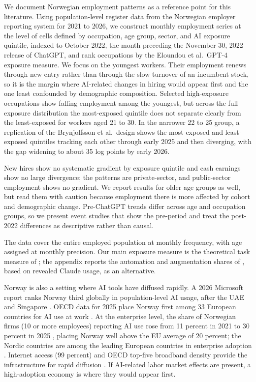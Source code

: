 \documentclass[12pt]{article}
\begin{document}
We document Norwegian employment patterns as a reference point for this literature. Using population-level register data from the Norwegian employer reporting system for 2021 to 2026, we construct monthly employment series at the level of cells defined by occupation, age group, sector, and AI exposure quintile, indexed to October 2022, the month preceding the November 30, 2022 release of ChatGPT, and rank occupations by the Eloundou et al.\ GPT-4 exposure measure. We focus on the youngest workers. Their employment renews through new entry rather than through the slow turnover of an incumbent stock, so it is the margin where AI-related changes in hiring would appear first and the one least confounded by demographic composition. Selected high-exposure occupations show falling employment among the youngest, but across the full exposure distribution the most-exposed quintile does not separate clearly from the least-exposed for workers aged 21 to 30. In the narrower 22 to 25 group, a replication of the Brynjolfsson et al.\ design shows the most-exposed and least-exposed quintiles tracking each other through early 2025 and then diverging, with the gap widening to about 35 log points by early 2026.

New hires show no systematic gradient by exposure quintile and cash earnings show no large divergence; the patterns are private-sector, and public-sector employment shows no gradient. We report results for older age groups as well, but read them with caution because employment there is more affected by cohort and demographic change. Pre-ChatGPT trends differ across age and occupation groups, so we present event studies that show the pre-period and treat the post-2022 differences as descriptive rather than causal.

The data cover the entire employed population at monthly frequency, with age assigned at monthly precision. Our main exposure measure is the theoretical task measure of \citet{eloundou2024}; the appendix reports the automation and augmentation shares of \citet{handa2025}, based on revealed Claude usage, as an alternative.

Norway is also a setting where AI tools have diffused rapidly. A 2026 Microsoft report ranks Norway third globally in population-level AI usage, after the UAE and Singapore \citep{microsoft2026ai}. OECD data for 2025 place Norway first among 33 European countries for AI use at work \citep{oecd2026ai}. At the enterprise level, the share of Norwegian firms (10 or more employees) reporting AI use rose from 11 percent in 2021 to 30 percent in 2025 \citep{ssb2025ikt}, placing Norway well above the EU average of 20 percent; the Nordic countries are among the leading European countries in enterprise adoption \citep{bick2026}. Internet access (99 percent) and OECD top-five broadband density provide the infrastructure for rapid diffusion \citep{oecd2024digitalnorway}. If AI-related labor market effects are present, a high-adoption economy is where they would appear first.
\end{document}
